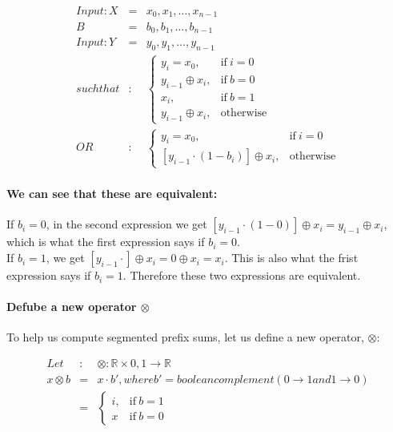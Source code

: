 \documentclass[11pt]{article}
\begin{document}
  \begin{eqnarray*}
    Input: X &=& {x_0, x_1, \dots , x_{n-1}}\\
    B &=& {b_0, b_1, \dots , b_{n-1}}\\
    Input: Y &=& {y_0, y_1, \dots , y_{n-1}}\\
    such that&:&
    \begin{cases}
      y_i = x_0, & \text{if}\ i = 0 \\
      y_{i-1} \oplus x_i, & \text{if}\ b = 0 \\
      x_i, & \text{if}\ b = 1 \\
      y_{i-1} \oplus x_i, & \text{otherwise}
    \end{cases}
    \\OR &:&
    \begin{cases}
      y_i = x_0, & \text{if}\ i = 0 \\
      [y_{i-1} \cdot (1 - b_i) ] \oplus x_i, & \text{otherwise}
    \end{cases}
  \end{eqnarray*}

\paragraph{We can see that these are equivalent:} 

If $b_i = 0$, in the second expression we get $[y_{i-1} \cdot (1-0)] \oplus x_i = y_{i-1} \oplus x_i$, which is what the first expression says if $b_i = 0$.\\
If $b_i = 1$, we get $[y_{i-1} \cdot] \oplus x_i = 0 \oplus x_i = x_i$. This is also what the frist expression says if $b_i = 1$. Therefore these two expressions are equivalent.

\paragraph{Defube a new operator $\otimes$} 
To help us compute segmented prefix sums, let us define a new operator, $\otimes$:

  \begin{eqnarray*}
    Let&:& \otimes: \mathbb{R} \times {0, 1} \longrightarrow \mathbb{R}\\
    x \otimes b &=& x \cdot b', where b' = boolean complement (0 \longrightarrow 1 and 1 \longrightarrow 0)\\
    &=&
    \begin{cases}
      i, & \text{if}\ b = 1 \\
      x & \text{if}\ b = 0
    \end{cases}
  \end{eqnarray*}
\end{document}
